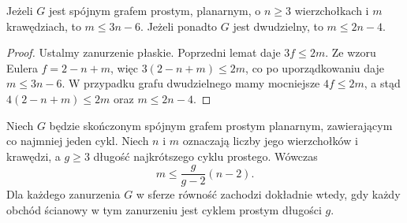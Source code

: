 \begin{twierdzenie}
\label{thm:tg-planarne-bound}
Jeżeli $G$ jest spójnym grafem prostym, planarnym,
o $n\ge3$ wierzchołkach i $m$ krawędziach, to
$m\le3n-6$. Jeżeli ponadto $G$ jest dwudzielny,
to $m\le2n-4$.
\end{twierdzenie}

\begin{proof}
Ustalmy zanurzenie płaskie. Poprzedni lemat daje
$3f\le2m$. Ze wzoru Eulera $f=2-n+m$,
więc $3(2-n+m)\le2m$, co po uporządkowaniu
daje $m\le3n-6$. W przypadku grafu dwudzielnego
mamy mocniejsze $4f\le2m$, a stąd
$4(2-n+m)\le2m$ oraz $m\le2n-4$.
\end{proof}

\begin{twierdzenie}
\label{thm:tg-planar-girth}
Niech $G$ będzie skończonym spójnym grafem prostym
planarnym, zawierającym co najmniej jeden cykl.
Niech $n$ i $m$ oznaczają liczby jego wierzchołków
i krawędzi, a $g\geq3$ długość najkrótszego cyklu prostego.
Wówczas
\[
m\leq\frac{g}{g-2}(n-2).
\]
Dla każdego zanurzenia $G$ w sferze równość zachodzi
dokładnie wtedy, gdy każdy obchód ścianowy w tym
zanurzeniu jest cyklem prostym długości $g$.
\end{twierdzenie}

